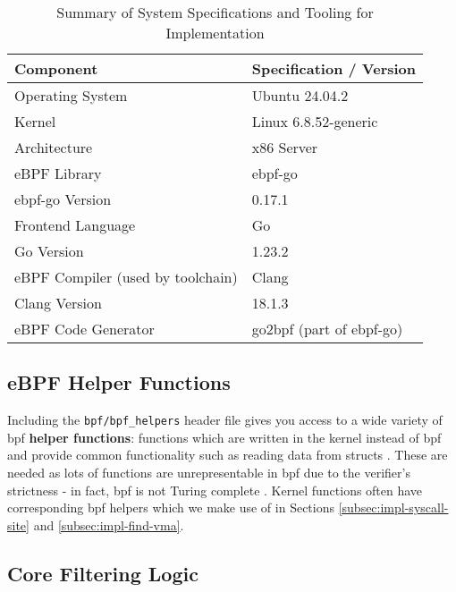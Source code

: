 \begin{table}[htbp] %
\centering
\caption{Summary of System Specifications and Tooling for \af Implementation}
\label{tab:specs_tooling}
\begin{tabular}{ll}
\toprule %
\textbf{Component} & \textbf{Specification / Version} \\
\midrule %
Operating System      & Ubuntu 24.04.2 \\
Kernel                & Linux 6.8.52-generic \\
Architecture          & x86 Server \\
eBPF Library          & ebpf-go \\
ebpf-go Version       & 0.17.1 \\
Frontend Language     & Go \\
Go Version            & 1.23.2 \\
eBPF Compiler (used by toolchain) & Clang \\
Clang Version         & 18.1.3 \\
eBPF Code Generator   & go2bpf (part of ebpf-go) \\
\bottomrule %
\end{tabular}
\end{table}

\subsection{eBPF Helper Functions}

Including the \texttt{bpf/bpf\_helpers} header file gives you access to a wide
variety of \ac{bpf} \textbf{helper functions}: functions which are written in
the kernel instead of \ac{bpf} and provide common functionality such as reading
data from structs \cite{ebpf-helper-functions-2025, ebpf-bpf-probe-read-user-2024}. 
These are needed as lots of functions are unrepresentable in 
\ac{bpf} due to the verifier's strictness - in fact, \ac{bpf} is not Turing
complete \cite{gregg-bpf-performance-tools-2019}. Kernel functions often have
corresponding \ac{bpf} helpers which we make use of in Sections
\ref{subsec:impl-syscall-site} and \ref{subsec:impl-find-vma}.

\subsection{Core Filtering Logic}

